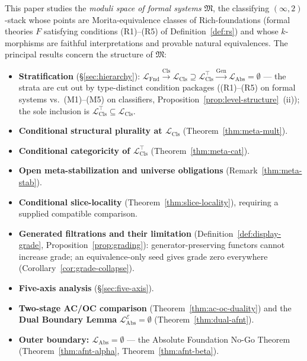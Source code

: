 \documentclass[11pt]{article}
\theoremstyle{plain}
\theoremstyle{definition}
\newcommand{\fM}{\mathfrak{M}}
\newcommand{\LFnd}{\mathcal{L}_{\mathrm{Fnd}}}
\newcommand{\LCls}{\mathcal{L}_{\mathrm{Cls}}}
\newcommand{\LClsMax}{\mathcal{L}_{\mathrm{Cls}}^{\top}}
\newcommand{\LAbs}{\mathcal{L}_{\mathrm{Abs}}}
\newcommand{\cE}{\mathcal{E}}
\newcommand{\LAbsE}{\LAbs^{\cE}}
\begin{document}
This paper studies the \emph{moduli space of formal systems} $\fM$, the classifying $(\infty, 2)$-stack whose points are Morita-equivalence classes of Rich-foundations (formal theories $F$ satisfying conditions (R1)--(R5) of Definition~\ref{def:rs}) and whose $k$-morphisms are faithful interpretations and provable natural equivalences. The principal results concern the structure of $\fM$:
\begin{itemize}
\item \textbf{Stratification} (\S\ref{sec:hierarchy}): $\LFnd \xrightarrow{\mathrm{Cls}} \LCls \supseteq \LClsMax \xrightarrow{\mathrm{Gen}} \LAbs = \emptyset$ --- the strata are cut out by type-distinct condition packages ((R1)--(R5) on formal systems vs.\ (M1)--(M5) on classifiers, Proposition~\ref{prop:level-structure}~(ii)); the sole inclusion is $\LClsMax \subseteq \LCls$.
\item \textbf{Conditional structural plurality at $\LCls$} (Theorem~\ref{thm:meta-mult}).
\item \textbf{Conditional categoricity of $\LClsMax$} (Theorem~\ref{thm:meta-cat}).
\item \textbf{Open meta-stabilization and universe obligations} (Remark~\ref{thm:meta-stab}).
\item \textbf{Conditional slice-locality} (Theorem~\ref{thm:slice-locality}), requiring a supplied compatible comparison.
\item \textbf{Generated filtrations and their limitation} (Definition~\ref{def:display-grade}, Proposition~\ref{prop:grading}): generator-preserving functors cannot increase grade; an equivalence-only seed gives grade zero everywhere (Corollary~\ref{cor:grade-collapse}).
\item \textbf{Five-axis analysis} (\S\ref{sec:five-axis}).
\item \textbf{Two-stage AC/OC comparison} (Theorem~\ref{thm:ac-oc-duality}) and the \textbf{Dual Boundary Lemma} $\LAbsE = \emptyset$ (Theorem~\ref{thm:dual-afnt}).
\item \textbf{Outer boundary: $\LAbs = \emptyset$} --- the Absolute Foundation No-Go Theorem (Theorem~\ref{thm:afnt-alpha}, Theorem~\ref{thm:afnt-beta}).
\end{itemize}
\end{document}
